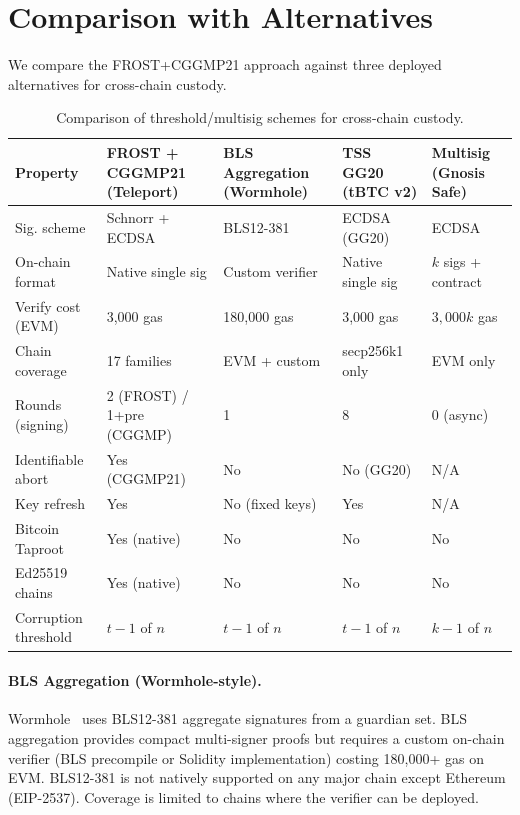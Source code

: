 \documentclass[11pt,twocolumn]{article}
\begin{document}
\section{Comparison with Alternatives}
\label{sec:comparison}

We compare the FROST+CGGMP21 approach against three deployed alternatives for
cross-chain custody.

\begin{table}[t]
\centering
\small
\begin{tabular}{@{}p{2.8cm}p{2.5cm}p{2.5cm}p{2.5cm}p{2.5cm}@{}}
\toprule
\textbf{Property} & \textbf{FROST + CGGMP21} (Teleport) & \textbf{BLS Aggregation} (Wormhole) & \textbf{TSS GG20} (tBTC v2) & \textbf{Multisig} (Gnosis Safe) \\
\midrule
Sig. scheme & Schnorr + ECDSA & BLS12-381 & ECDSA (GG20) & ECDSA \\
On-chain format & Native single sig & Custom verifier & Native single sig & $k$ sigs + contract \\
Verify cost (EVM) & 3,000 gas & 180,000 gas & 3,000 gas & $3{,}000k$ gas \\
Chain coverage & 17 families & EVM + custom & secp256k1 only & EVM only \\
Rounds (signing) & 2 (FROST) / 1+pre (CGGMP) & 1 & 8 & 0 (async) \\
Identifiable abort & Yes (CGGMP21) & No & No (GG20) & N/A \\
Key refresh & Yes & No (fixed keys) & Yes & N/A \\
Bitcoin Taproot & Yes (native) & No & No & No \\
Ed25519 chains & Yes (native) & No & No & No \\
Corruption threshold & $t{-}1$ of $n$ & $t{-}1$ of $n$ & $t{-}1$ of $n$ & $k{-}1$ of $n$ \\
\bottomrule
\end{tabular}
\caption{Comparison of threshold/multisig schemes for cross-chain custody.}
\label{tab:comparison}
\end{table}

\paragraph{BLS Aggregation (Wormhole-style).}
Wormhole~\cite{wormhole2023} uses BLS12-381 aggregate signatures from a guardian set.
BLS aggregation provides compact multi-signer proofs but requires a custom on-chain
verifier (BLS precompile or Solidity implementation) costing 180,000+ gas on EVM.
BLS12-381 is not natively supported on any major chain except Ethereum (EIP-2537).
Coverage is limited to chains where the verifier can be deployed.
\end{document}

